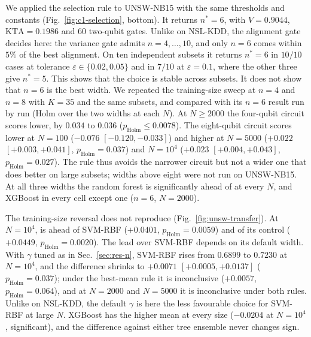 

We applied the selection rule to UNSW-NB15 with the same thresholds and constants
(Fig.~\ref{fig:c1-selection}, bottom). It returns $n^{\ast}=6$, with $V=0.9044$,
$\mathrm{KTA}=0.1986$ and $60$ two-qubit gates. Unlike on NSL-KDD, the alignment gate decides
here: the variance gate admits $n=4,\dots,10$, and only $n=6$ comes within $5\%$ of the best
alignment. On ten independent subsets it returns
$n^{\ast}=6$ in $10/10$ cases at tolerance $\varepsilon\in\{0.02,0.05\}$ and in $7/10$ at
$\varepsilon=0.1$, where the other three give $n^{\ast}=5$. This shows that the choice is
stable across subsets. It does not show that $n=6$ is the best width.
We repeated the training-size sweep at $n=4$ and $n=8$ with $K=35$ and the same subsets, and
compared \QSVM{} with its $n=6$ result run by run (Holm over the two widths at each $N$). At
$N\geq2000$ the four-qubit circuit scores lower, by $0.034$ to $0.036$
($p_{\mathrm{Holm}}\leq0.0078$). The eight-qubit circuit scores lower at $N=100$ ($-0.076$
$[-0.120,-0.033]$) and higher at $N=5000$ ($+0.022$ $[+0.003,+0.041]$,
$p_{\mathrm{Holm}}=0.037$) and $N=10^4$ ($+0.023$ $[+0.004,+0.043]$, $p_{\mathrm{Holm}}=0.027$).
The rule thus avoids the narrower circuit but not a wider one that does better on large
subsets; widths above eight were not run on UNSW-NB15. At all three widths the random forest is
significantly ahead of \QSVM{} at every $N$, and XGBoost in every cell except one ($n=6$,
$N=2000$).

The training-size reversal does not reproduce (Fig.~\ref{fig:unsw-transfer}). At $N=10^4$,
\QSVM{} is ahead of SVM-RBF ($+0.0401$, $p_{\mathrm{Holm}}=0.0059$) and of its \Zmap{} control
($+0.0449$, $p_{\mathrm{Holm}}=0.0020$). The lead over SVM-RBF depends on its default width.
With $\gamma$ tuned as in Sec.~\ref{sec:res-n}, SVM-RBF rises from $0.6899$ to $0.7230$ at
$N=10^4$, and the difference shrinks to $+0.0071$ $[+0.0005,+0.0137]$
($p_{\mathrm{Holm}}=0.037$); under the best-mean rule it is inconclusive ($+0.0057$,
$p_{\mathrm{Holm}}=0.064$), and at $N=2000$ and $N=5000$ it is inconclusive under both rules.
Unlike on NSL-KDD, the default $\gamma$ is here the less favourable choice for SVM-RBF at
large $N$. XGBoost has the higher mean at every size ($-0.0204$ at
$N=10^4$, significant), and the difference against either tree ensemble never changes sign.

